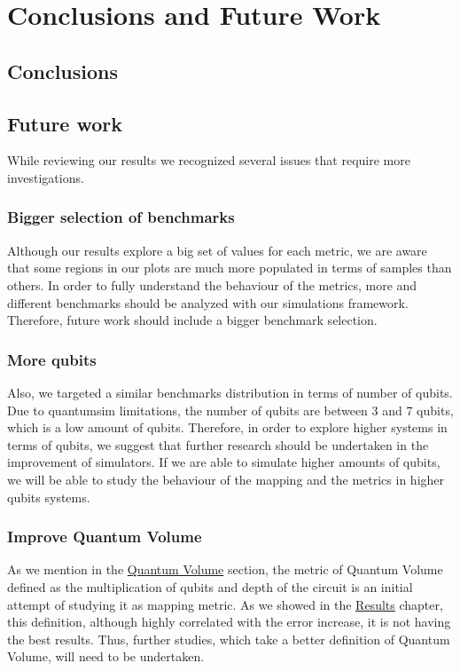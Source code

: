 

\chapter{Conclusions and Future Work}
\label{sec:org7d44186}
\section{Conclusions}
\label{sec:org16e6d2d}
\section{Future work}
\label{sec:org84160a2}

While reviewing our results we recognized several issues that require more investigations.

\subsection{Bigger selection of benchmarks}
\label{sec:org3deb249}

Although our results explore a big set of values for each metric, we are aware that some regions in our plots are much more populated in terms of samples than others.
In order to fully understand the behaviour of the metrics, more and different benchmarks should be analyzed with our simulations framework.
Therefore, future work should include a bigger benchmark selection.

\subsection{More qubits}
\label{sec:orga80887a}

Also, we targeted a similar benchmarks distribution in terms of number of qubits.
Due to quantumsim limitations, the number of qubits are between 3 and 7 qubits, which is a low amount of qubits.
Therefore, in order to explore higher systems in terms of qubits, we suggest that further research should be undertaken in the improvement of simulators.
If we are able to simulate higher amounts of qubits, we will be able to study the behaviour of the mapping and the metrics in higher qubits systems.

\subsection{Improve Quantum Volume}
\label{sec:org8775948}

As we mention in the \hyperref[]{Quantum Volume} section, the metric of Quantum Volume defined as the multiplication of qubits and depth of the circuit is an initial attempt of studying it as mapping metric.
As we showed in the \hyperref[]{Results} chapter, this definition, although highly correlated with the error increase, it is not having the best results.
Thus, further studies, which take a better definition of Quantum Volume, will need to be undertaken.

